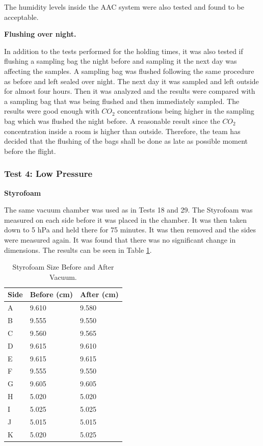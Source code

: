 \documentclass[a4paper,12pt,oneside]{article}
\begin{document}
The humidity levels inside the AAC system were also tested and found to be acceptable. 

\textbf{Flushing over night.}

In addition to the tests performed for the holding times, it was also tested if flushing a sampling bag the night before and sampling it the next day was affecting the samples. A sampling bag was flushed following the same procedure as before and left sealed over night. The next day it was sampled and left outside for almost four hours. Then it was analyzed and the results were compared with a sampling bag that was being flushed and then immediately sampled. The results were good enough with $CO_2$ concentrations being higher in the sampling bag which was flushed the night before. A reasonable result since the $CO_2$ concentration inside a room is higher than outside. Therefore, the team has decided that the flushing of the bags shall be done as late as possible moment before the flight. 

 


\subsubsection{Test 4: Low Pressure}\label{lowpressure}

\textbf{Styrofoam}

The same vacuum chamber was used as in Tests 18 and 29. The Styrofoam was measured on each side before it was placed in the chamber. It was then taken down to 5 hPa and held there for 75 minutes. It was then removed and the sides were measured again. It was found that there was no significant change in dimensions. The results can be seen in Table \ref{tab:styrofoam-test-result-2}.

\begin{table}[H]
\centering
\begin{tabular}{|l|l|l|}
\hline
Side & Before (cm) & After (cm) \\ \hline
A & 9.610 & 9.580 \\ \hline
B & 9.555 & 9.550 \\ \hline
C & 9.560 & 9.565 \\ \hline
D & 9.615 & 9.610 \\ \hline
E & 9.615 & 9.615 \\ \hline
F & 9.555 & 9.550 \\ \hline
G & 9.605 & 9.605 \\ \hline
H & 5.020 & 5.020 \\ \hline
I & 5.025 & 5.025 \\ \hline
J & 5.015 & 5.015 \\ \hline
K & 5.020 & 5.025 \\ \hline
\end{tabular}
\caption{Styrofoam Size Before and After Vacuum.}
\label{tab:styrofoam-test-result-2}
\end{table}
\end{document}
